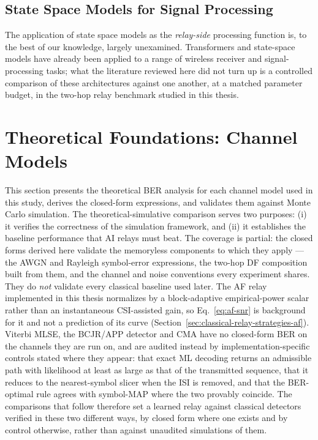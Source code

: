 \subsection{State Space Models for Signal Processing}\label{sec:state-space-models-for-signal-processing}

The application of state space models as the \emph{relay-side} processing function is, to the best of our
knowledge, largely unexamined. Transformers and state-space models have already been applied to a range of
wireless receiver and signal-processing tasks; what the literature reviewed here did not turn up is a
controlled comparison of these architectures against one another, at a matched parameter budget, in the
two-hop relay benchmark studied in this thesis.

\section{Theoretical Foundations: Channel Models}\label{sec:theoretical-foundations-channel-models}

This section presents the theoretical BER analysis for each channel model used in this study, derives the closed-form expressions, and validates them against Monte Carlo simulation. The theoretical-simulative comparison serves two purposes: (i) it verifies the correctness of the simulation framework, and (ii) it establishes the baseline performance that AI relays must beat. The coverage is partial: the closed forms derived here validate the memoryless components to which they apply --- the AWGN and Rayleigh symbol-error expressions, the two-hop DF composition built from them, and the channel and noise conventions every experiment shares. They do \emph{not} validate every classical baseline used later. The AF relay implemented in this thesis normalizes by a block-adaptive empirical-power scalar rather than an instantaneous CSI-assisted gain, so Eq.~\eqref{eq:af-snr} is background for it and not a prediction of its curve (Section~\ref{sec:classical-relay-strategies-af}). Viterbi MLSE, the BCJR/APP detector and CMA have no closed-form BER on the channels they are run on, and are audited instead by implementation-specific controls stated where they appear: that exact ML decoding returns an admissible path with likelihood at least as large as that of the transmitted sequence, that it reduces to the nearest-symbol slicer when the ISI is removed, and that the BER-optimal rule agrees with symbol-MAP where the two provably coincide. The comparisons that follow therefore set a learned relay against classical detectors verified in these two different ways, by closed form where one exists and by control otherwise, rather than against unaudited simulations of them.

